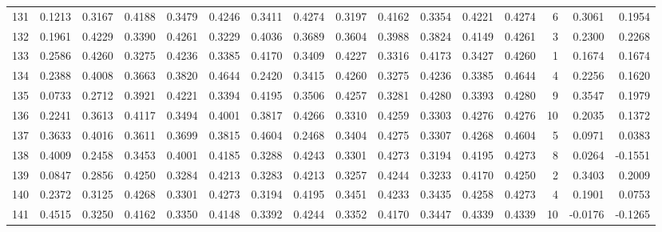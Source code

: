 \begin{tabular}{lrrrrrrrrrrrrrrr}
131 &      0.1213 &  0.3167 &  0.4188 &  0.3479 &  0.4246 &  0.3411 &  0.4274 &  0.3197 &  0.4162 &  0.3354 &   0.4221 &     0.4274 &      6 &                    0.3061 &                     0.1954 \\
132 &      0.1961 &  0.4229 &  0.3390 &  0.4261 &  0.3229 &  0.4036 &  0.3689 &  0.3604 &  0.3988 &  0.3824 &   0.4149 &     0.4261 &      3 &                    0.2300 &                     0.2268 \\
133 &      0.2586 &  0.4260 &  0.3275 &  0.4236 &  0.3385 &  0.4170 &  0.3409 &  0.4227 &  0.3316 &  0.4173 &   0.3427 &     0.4260 &      1 &                    0.1674 &                     0.1674 \\
134 &      0.2388 &  0.4008 &  0.3663 &  0.3820 &  0.4644 &  0.2420 &  0.3415 &  0.4260 &  0.3275 &  0.4236 &   0.3385 &     0.4644 &      4 &                    0.2256 &                     0.1620 \\
135 &      0.0733 &  0.2712 &  0.3921 &  0.4221 &  0.3394 &  0.4195 &  0.3506 &  0.4257 &  0.3281 &  0.4280 &   0.3393 &     0.4280 &      9 &                    0.3547 &                     0.1979 \\
136 &      0.2241 &  0.3613 &  0.4117 &  0.3494 &  0.4001 &  0.3817 &  0.4266 &  0.3310 &  0.4259 &  0.3303 &   0.4276 &     0.4276 &     10 &                    0.2035 &                     0.1372 \\
137 &      0.3633 &  0.4016 &  0.3611 &  0.3699 &  0.3815 &  0.4604 &  0.2468 &  0.3404 &  0.4275 &  0.3307 &   0.4268 &     0.4604 &      5 &                    0.0971 &                     0.0383 \\
138 &      0.4009 &  0.2458 &  0.3453 &  0.4001 &  0.4185 &  0.3288 &  0.4243 &  0.3301 &  0.4273 &  0.3194 &   0.4195 &     0.4273 &      8 &                    0.0264 &                    -0.1551 \\
139 &      0.0847 &  0.2856 &  0.4250 &  0.3284 &  0.4213 &  0.3283 &  0.4213 &  0.3257 &  0.4244 &  0.3233 &   0.4170 &     0.4250 &      2 &                    0.3403 &                     0.2009 \\
140 &      0.2372 &  0.3125 &  0.4268 &  0.3301 &  0.4273 &  0.3194 &  0.4195 &  0.3451 &  0.4233 &  0.3435 &   0.4258 &     0.4273 &      4 &                    0.1901 &                     0.0753 \\
141 &      0.4515 &  0.3250 &  0.4162 &  0.3350 &  0.4148 &  0.3392 &  0.4244 &  0.3352 &  0.4170 &  0.3447 &   0.4339 &     0.4339 &     10 &                   -0.0176 &                    -0.1265 \\

\end{tabular}

